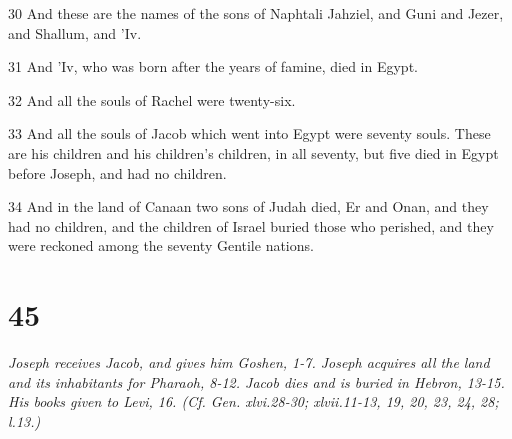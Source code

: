 \par 30 And these are the names of the sons of Naphtali Jahziel, and Guni and Jezer, and Shallum, and 'Iv.
\par 31 And 'Iv, who was born after the years of famine, died in Egypt.
\par 32 And all the souls of Rachel were twenty-six.
\par 33 And all the souls of Jacob which went into Egypt were seventy souls. These are his children and his children's children, in all seventy, but five died in Egypt before Joseph, and had no children.
\par 34 And in the land of Canaan two sons of Judah died, Er and Onan, and they had no children, and the children of Israel buried those who perished, and they were reckoned among the seventy Gentile nations.

\chapter{45}

\par \textit{Joseph receives Jacob, and gives him Goshen, 1-7. Joseph acquires all the land and its inhabitants for Pharaoh, 8-12. Jacob dies and is buried in Hebron, 13-15. His books given to Levi, 16. (Cf. Gen. xlvi.28-30; xlvii.11-13, 19, 20, 23, 24, 28; l.13.)}

